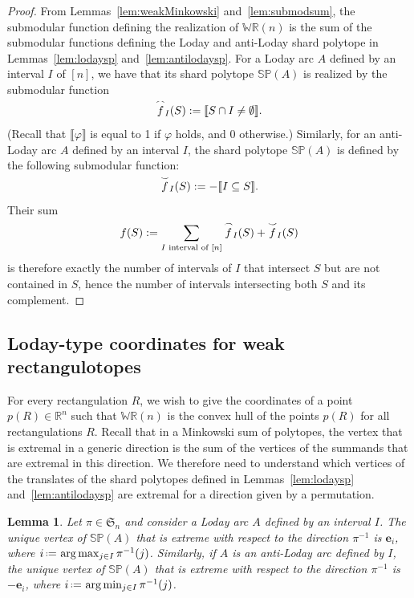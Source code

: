 \documentclass{amsart}
\newtheorem{lemma}[theorem]{Lemma}
\theoremstyle{definition}
\newcommand{\R}{\mathbb{R}} %
\newcommand{\f}[1]{\mathfrak{#1}} %
\newcommand{\eqdef}{\mbox{\,\raisebox{0.2ex}{\scriptsize\ensuremath{\mathrm:}}\ensuremath{=}\,}} %
\newcommand{\polytope}[1]{\mathds{#1}} %
\newcommand{\WRP}{\polytope{WR}} %
\newcommand{\SP}{\polytope{SP}}
\newcommand{\loday}[1]{\smash{\overset{\frown}{#1}}}
\newcommand{\antiloday}[1]{\smash{\overset{\smile}{#1}}}
\begin{document}
\begin{proof}
  From Lemmas~\ref{lem:weakMinkowski} and~\ref{lem:submodsum}, the submodular function defining the realization of $\WRP(n)$ is the sum of the submodular functions defining the Loday and anti-Loday shard polytope in Lemmas~\ref{lem:lodaysp} and~\ref{lem:antilodaysp}. For a Loday arc $A$ defined by an interval $I$ of $[n]$, we have that its shard polytope $\SP(A)$ is realized by the submodular function
  \[
  \loday{f}_I(S) := \llbracket S\cap I\not=\emptyset \rrbracket .
  \]
  (Recall that $\llbracket \varphi\rrbracket$ is equal to 1 if $\varphi$ holds, and 0 otherwise.)
  Similarly, for an anti-Loday arc $A$ defined by an interval $I$, the shard polytope $\SP(A)$ is defined by the following submodular function:
  \[
  \antiloday{f}_I(S) := - \llbracket I\subseteq S \rrbracket .
  \]
  Their sum
  \[
  f(S) := \sum_{I\text{ interval of }[n]} \loday{f}_I(S) + \antiloday{f}_I(S)
  \]
  is therefore exactly the number of intervals of $I$ that intersect $S$ but are not contained in $S$, hence the number of intervals intersecting both $S$ and its complement.
\end{proof}

\subsection{Loday-type coordinates for weak rectangulotopes}

For every rectangulation $R$, we wish to give the coordinates of a point $p(R)\in\R^n$ such that $\WRP(n)$ is the convex hull of the points $p(R)$ for all rectangulations $R$.
Recall that in a Minkowski sum of polytopes, the vertex that is extremal in a generic direction is the sum of the vertices of the summands that are extremal in this direction.
We therefore need to understand which vertices of the translates of the shard polytopes defined in Lemmas~\ref{lem:lodaysp} and~\ref{lem:antilodaysp} are extremal for a direction given by a permutation.

\begin{lemma}
  \label{lem:lodaymax}
  Let $\pi\in\f{S}_n$ and consider a Loday arc $A$ defined by an interval $I$.
  The unique vertex of $\SP(A)$ that is extreme with respect to the direction $\pi^{-1}$
  is $\mathbf{e}_i$, where $i \eqdef \arg\max_{j\in I} \pi^{-1}(j)$.
  Similarly, if $A$ is an anti-Loday arc defined by $I$, the unique vertex of $\SP(A)$ that is extreme with respect to the direction $\pi^{-1}$
  is $-\mathbf{e}_i$, where $i \eqdef \arg\min_{j\in I} \pi^{-1}(j)$.
\end{lemma}
\end{document}

